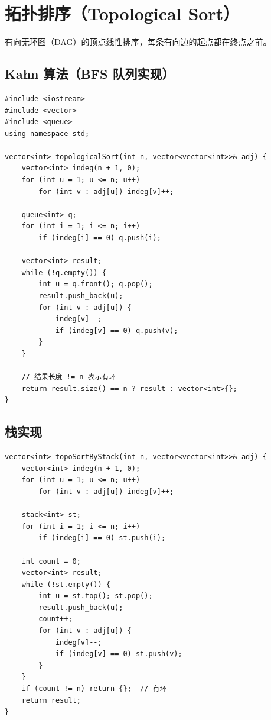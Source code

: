 \documentclass[12pt,a4paper]{article}
\begin{document}
\newpage

\section{拓扑排序（Topological Sort）}
有向无环图（DAG）的顶点线性排序，每条有向边的起点都在终点之前。

\subsection{Kahn 算法（BFS 队列实现）}

\begin{lstlisting}[caption={拓扑排序（Kahn 算法）}]
#include <iostream>
#include <vector>
#include <queue>
using namespace std;

vector<int> topologicalSort(int n, vector<vector<int>>& adj) {
    vector<int> indeg(n + 1, 0);
    for (int u = 1; u <= n; u++)
        for (int v : adj[u]) indeg[v]++;

    queue<int> q;
    for (int i = 1; i <= n; i++)
        if (indeg[i] == 0) q.push(i);

    vector<int> result;
    while (!q.empty()) {
        int u = q.front(); q.pop();
        result.push_back(u);
        for (int v : adj[u]) {
            indeg[v]--;
            if (indeg[v] == 0) q.push(v);
        }
    }

    // 结果长度 != n 表示有环
    return result.size() == n ? result : vector<int>{};
}
\end{lstlisting}

\subsection{栈实现}

\begin{lstlisting}[caption={拓扑排序（栈实现）}]
vector<int> topoSortByStack(int n, vector<vector<int>>& adj) {
    vector<int> indeg(n + 1, 0);
    for (int u = 1; u <= n; u++)
        for (int v : adj[u]) indeg[v]++;

    stack<int> st;
    for (int i = 1; i <= n; i++)
        if (indeg[i] == 0) st.push(i);

    int count = 0;
    vector<int> result;
    while (!st.empty()) {
        int u = st.top(); st.pop();
        result.push_back(u);
        count++;
        for (int v : adj[u]) {
            indeg[v]--;
            if (indeg[v] == 0) st.push(v);
        }
    }
    if (count != n) return {};  // 有环
    return result;
}
\end{lstlisting}
\end{document}
